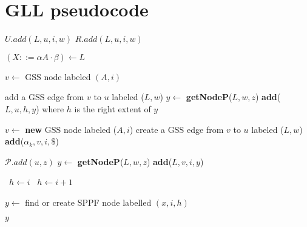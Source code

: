 \appendix

\section{GLL pseudocode}\label{GLLCode}
\begin{algorithmic}
    \State $U.add(L,u,i,w)$
    \State $R.add(L,u,i,w)$
    \EndIf
    \EndFunction
\end{algorithmic}

\begin{algorithmic}    
    \State $(X ::= \alpha A \cdot \beta) \gets L$
    
    \State $v \gets$ GSS node labeled $(A, i)$
    
    \State add a GSS edge from $v$ to $u$ labeled ($L,w$)
    \State $y \gets$ \textbf{getNodeP}($L,w,z$)
    \State \textbf{add}($L, u, h, y$) where $h$ is the right extent of $y$
    \EndFor
    \EndIf
    
    \Else
    \State $v \gets$ \textbf{new} GSS node labeled ($A, i$)
    \State create a GSS edge from $v$ to $u$ labeled ($L, w$)
    \State \textbf{add}($\alpha_{k}, v, i, \$ $)
    \EndFor
    \EndIf
    \EndFunction
\end{algorithmic}

\begin{algorithmic}   
    \State $\mathcal{P}.add(u,z)$
    \State $y \gets$ \textbf{getNodeP}($L, w, z$)
    \State \textbf{add}($L,v,i,y$)
    \EndFor
    \EndIf
    \EndFunction
\end{algorithmic}

\begin{algorithmic}   
    \  $h \gets i$
    \Else
    \  $h \gets i + 1$
    \EndIf
    
    \State $y \gets$ find or create SPPF node labelled $(x, i, h)$
    
    \Return $y$
    
    \EndFunction
\end{algorithmic}

